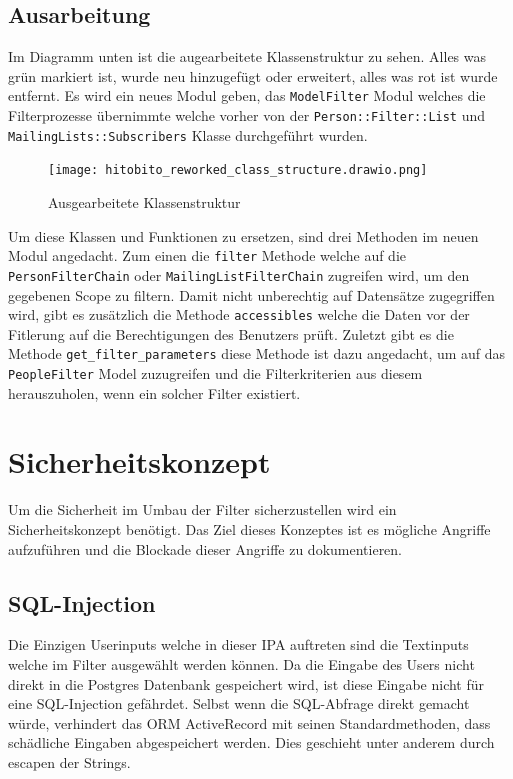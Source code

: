 \newpage

\begin{landscape}
   \subsection{Ausarbeitung}
   Im Diagramm unten ist die augearbeitete Klassenstruktur zu sehen. Alles was grün markiert ist, wurde neu
   hinzugefügt oder erweitert, alles was rot ist wurde entfernt. Es wird ein neues Modul geben, das \texttt{ModelFilter} Modul
   welches die Filterprozesse übernimmte welche vorher von der \texttt{Person::Filter::List} und \texttt{MailingLists::Subscribers} Klasse
   durchgeführt wurden. 

   \begin{figure}[h]
      \centering
      \texttt{[image: hitobito\_reworked\_class\_structure.drawio.png]}
      \caption{Ausgearbeitete Klassenstruktur}
   \end{figure}

   Um diese Klassen und Funktionen zu ersetzen, sind drei Methoden im neuen Modul angedacht. Zum einen die \texttt{filter} Methode welche 
   auf die \texttt{Person\:\:Filter\:\:Chain} oder \texttt{MailingList\:\:Filter\:\:Chain} zugreifen wird, um den gegebenen Scope zu filtern.
   Damit nicht unberechtig auf Datensätze zugegriffen wird, gibt es zusätzlich die Methode \texttt{accessibles} welche die Daten vor der Fitlerung auf
   die Berechtigungen des Benutzers prüft. Zuletzt gibt es die Methode \texttt{get\_filter\_parameters} diese Methode ist dazu angedacht, um auf das \texttt{PeopleFilter}
   Model zuzugreifen und die Filterkriterien aus diesem herauszuholen, wenn ein solcher Filter existiert.


\end{landscape}

\section{Sicherheitskonzept}
Um die Sicherheit im Umbau der Filter sicherzustellen wird ein Sicherheitskonzept
benötigt. Das Ziel dieses Konzeptes ist es mögliche Angriffe aufzuführen
und die Blockade dieser Angriffe zu dokumentieren. 

\subsection{SQL-Injection}
Die Einzigen Userinputs welche in dieser IPA auftreten sind die Textinputs welche im Filter
ausgewählt werden können. Da die Eingabe des Users nicht direkt in die Postgres Datenbank gespeichert wird,
ist diese Eingabe nicht für eine SQL-Injection gefährdet. Selbst wenn die SQL-Abfrage direkt gemacht würde,
verhindert das ORM ActiveRecord mit seinen Standardmethoden, dass schädliche Eingaben abgespeichert werden.
Dies geschieht unter anderem durch escapen der Strings.

